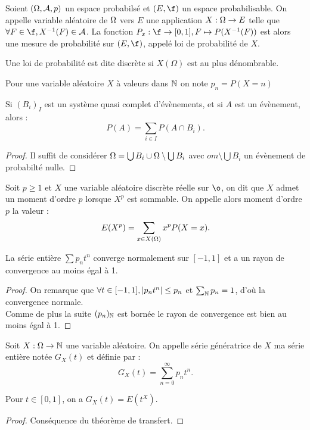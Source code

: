 \begin{defn}
Soient $(\Omega, \mathcal{A}, p)$ un espace probabilsé et $(E, \f)$ un espace probabilisable. 
On appelle variable aléatoire de $\Omega$ vers $E$ une application $X : \Omega \to E$ telle que $\forall F \in \f, X^{-1}(F) \in \a$.
La fonction $P_x : \f \to [0,1], F \mapsto P(X^{-1}(F))$ est alors une mesure de probabilité sur $(E, \f)$, appelé loi de probabilité de $X$.
\end{defn}

\begin{rmq}
Une loi de probabilité est dite discrète si $X(\Omega)$ est au plus dénombrable.
\end{rmq}

\begin{nota}
Pour une variable aléatoire $X$ à valeurs dans $\mathbb{N}$ on note $p_n = P(X=n)$
\end{nota}

\begin{lem}
Si $(B_i)_I$ est un système quasi complet d'évènements, et si $A$ est un évènement, alors :
\[ P(A) = \sum_{i \in I} P(A \cap B_i) . \] 
\end{lem}

\begin{proof}
Il suffit de considérer $\Omega = \bigcup B_i \cup \Omega \setminus \bigcup B_i$ avec $om \setminus \bigcup B_i$ un évènement de 
probabilté nulle.
\end{proof}

\begin{defn}[Moment]
Soit $p \geq 1$ et $X$ une variable aléatoire discrète réelle sur $\o$, on dit que $X$ admet un moment d'ordre $p$ lorsque
$X^p$ est sommable. On appelle alors moment d'ordre $p$ la valeur :
\[ E(X^p) = \sum_{x \in X(\Omega)} x^p P(X=x) . \]
\end{defn}

\begin{lem}
La série entière $\sum p_n t^n$ converge normalement sur $[-1,1]$ et a un rayon de convergence au moins égal à 1.
\end{lem}

\begin{proof}
On remarque que $\forall t \in [-1, 1], \lvert p_n t^n\rvert \leq p_n$ et $\sum_{\mathbb{N}} p_n = 1$, d'où la convergence normale. \\
Comme de plus la suite $(p_n)_{\mathbb{N}}$ est bornée le rayon de convergence est bien au moins égal à 1.
\end{proof}

\begin{defn}
Soit $X : \Omega \to \mathbb{N}$ une variable aléatoire. On appelle série génératrice de $X$ ma série entière notée $G_X(t)$ et définie par :
\[ G_X(t) = \sum_{n=0}^{\infty} p_n t^n . \]
\end{defn}

\begin{lem}
Pour $t \in [0,1]$, on a $G_X(t) = E(t^X)$.
\end{lem}

\begin{proof}
Conséquence du théorème de transfert.
\end{proof}


